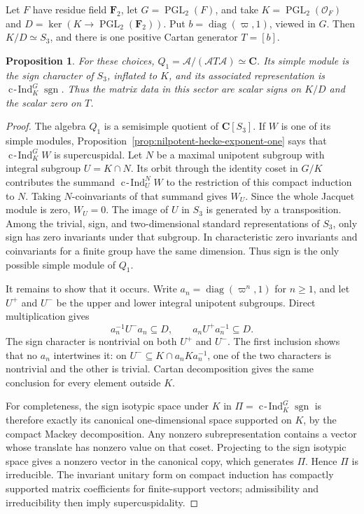 \documentclass[10pt,letterpaper]{amsart}
\numberwithin{equation}{section}
\newtheorem{proposition}[theorem]{Proposition}
\theoremstyle{remark}
\newcommand{\cInd}{\operatorname{c\!-\!Ind}}
\newcommand{\C}{\mathbf C}
\begin{document}
Let $F$ have residue field $\mathbf F_2$, let $G=\operatorname{PGL}_2(F)$,
and take $K=\operatorname{PGL}_2(\mathcal O_F)$ and
$D=\ker(K\to\operatorname{PGL}_2(\mathbf F_2))$. Put
$b=\operatorname{diag}(\varpi,1)$, viewed in $G$. Then $K/D\simeq S_3$,
and there is one positive Cartan generator $T=[b]$.

\begin{proposition}\label{prop:dyadic-example}
For these choices, $Q_1=\mathcal A/(\mathcal A T\mathcal A)\simeq\C$.
Its simple module is the sign character of $S_3$, inflated to $K$, and
its associated representation is $\cInd_K^G\operatorname{sgn}$.
Thus the matrix data in this sector are scalar signs on $K/D$ and the
scalar zero on $T$.
\end{proposition}

\begin{proof}
The algebra $Q_1$ is a semisimple quotient of $\C[S_3]$. If $W$ is one
of its simple modules, Proposition~\ref{prop:nilpotent-hecke-exponent-one}
says that $\cInd_K^G W$ is supercuspidal. Let $N$ be a maximal unipotent
subgroup with integral subgroup $U=K\cap N$. Its orbit through the
identity coset in $G/K$ contributes the summand $\cInd_U^N W$ to the
restriction of this compact induction to $N$. Taking $N$-coinvariants
of that summand gives $W_U$. Since the whole Jacquet module is zero,
$W_U=0$. The image of $U$ in $S_3$ is generated by a transposition.
Among the trivial, sign, and two-dimensional standard representations
of $S_3$, only sign has zero invariants under that subgroup. In
characteristic zero invariants and coinvariants for a finite group have
the same dimension. Thus sign is the only possible simple module of $Q_1$.

It remains to show that it occurs. Write $a_n=\operatorname{diag}(\varpi^n,1)$
for $n\ge1$, and let $U^+$ and $U^-$ be the upper and lower integral
unipotent subgroups. Direct multiplication gives
\[
 a_n^{-1}U^-a_n\subseteq D,\qquad a_nU^+a_n^{-1}\subseteq D.
\]
The sign character is nontrivial on both $U^+$ and $U^-$. The first
inclusion shows that no $a_n$ intertwines it: on $U^-\subseteq
K\cap a_nKa_n^{-1}$, one of the two characters is nontrivial and the
other is trivial. Cartan decomposition gives the same conclusion for
every element outside $K$.

For completeness, the sign isotypic space under $K$ in
$\Pi=\cInd_K^G\operatorname{sgn}$ is therefore exactly its canonical
one-dimensional space supported on $K$, by the compact Mackey
decomposition. Any nonzero subrepresentation contains a vector whose
translate has nonzero value on that coset. Projecting to the sign
isotypic space gives a nonzero vector in the canonical copy, which
generates $\Pi$. Hence $\Pi$ is irreducible. The invariant unitary form
on compact induction has compactly supported matrix coefficients for
finite-support vectors; admissibility and irreducibility then imply
supercuspidality.


\end{proof}
\end{document}
